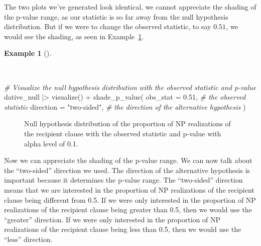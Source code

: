 \documentclass[
  letterpaper,
  DIV=11,
  numbers=noendperiod]{scrreprt}
\newenvironment{Shaded}{\begin{snugshade}}{\end{snugshade}}
\newcommand{\AttributeTok}[1]{\textcolor[rgb]{0.00,0.00,0.00}{#1}}
\newcommand{\CommentTok}[1]{\textcolor[rgb]{0.00,0.00,0.00}{\textit{#1}}}
\newcommand{\FloatTok}[1]{\textcolor[rgb]{0.00,0.00,0.00}{#1}}
\newcommand{\FunctionTok}[1]{\textcolor[rgb]{0.00,0.00,0.00}{#1}}
\newcommand{\NormalTok}[1]{\textcolor[rgb]{0.00,0.00,0.00}{#1}}
\newcommand{\SpecialCharTok}[1]{\textcolor[rgb]{0.00,0.00,0.00}{#1}}
\newcommand{\StringTok}[1]{\textcolor[rgb]{0.00,0.00,0.00}{#1}}
\theoremstyle{definition}
\newtheorem{example}{Example}[chapter]
\theoremstyle{remark}
\begin{document}
The two plots we've generated look identical, we cannot appreciate the
shading of the p-value range, as our statistic is so far away from the
null hypothesis distribution. But if we were to change the observed
statistic, to say \(0.51\), we would see the shading, as seen in
Example~\ref{exm-ida-cat-null-hypothesis-obs-pval-alpha}.

\begin{example}[]\protect\hypertarget{exm-ida-cat-null-hypothesis-obs-pval-alpha}{}\label{exm-ida-cat-null-hypothesis-obs-pval-alpha}

~

\begin{Shaded}
\begin{Highlighting}[]
\CommentTok{\# Visualize the null hypothesis distribution with the observed statistic and p{-}value}
\NormalTok{dative\_null }\SpecialCharTok{|\textgreater{}}
  \FunctionTok{visualize}\NormalTok{() }\SpecialCharTok{+}
  \FunctionTok{shade\_p\_value}\NormalTok{(}
    \AttributeTok{obs\_stat =} \FloatTok{0.51}\NormalTok{, }\CommentTok{\# the observed statistic}
    \AttributeTok{direction =} \StringTok{"two{-}sided"}\NormalTok{, }\CommentTok{\# the direction of the alternative hypothesis}
\NormalTok{  )}
\end{Highlighting}
\end{Shaded}

\begin{figure}[H]


\caption{\label{fig-ida-cat-null-hypothesis-obs-pval-alpha}Null
hypothesis distribution of the proportion of NP realizations of the
recipient clause with the observed statistic and p-value with alpha
level of 0.1.}

\end{figure}%

\end{example}

Now we can appreciate the shading of the p-value range. We can now talk
about the ``two-sided'' direction we used. The direction of the
alternative hypothesis is important because it determines the p-value
range. The ``two-sided'' direction means that we are interested in the
proportion of NP realizations of the recipient clause being different
from 0.5. If we were only interested in the proportion of NP
realizations of the recipient clause being greater than 0.5, then we
would use the ``greater'' direction. If we were only interested in the
proportion of NP realizations of the recipient clause being less than
0.5, then we would use the ``less'' direction.
\end{document}
